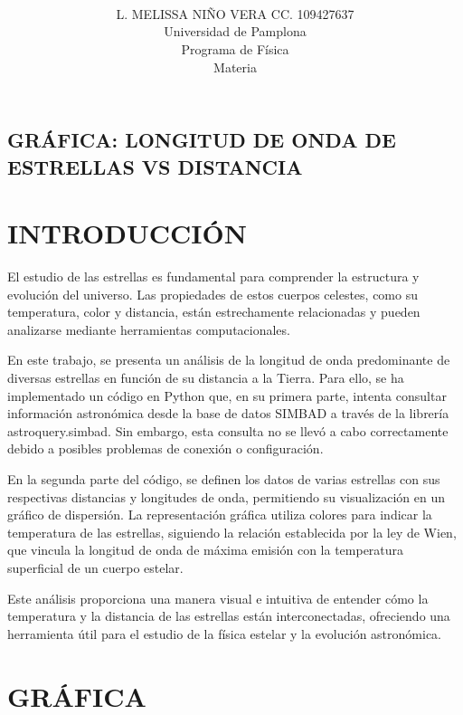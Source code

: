 \documentclass{article}
\title{ }
\author{\\ L. MELISSA NIÑO VERA   CC. 109427637 \\  Universidad de Pamplona \\ Programa de Física \\ Materia }
\begin{document}
\maketitle
\thispagestyle{fancy}

\begin{center}
    \section*{GRÁFICA: LONGITUD DE ONDA DE ESTRELLAS VS DISTANCIA}
\end{center}

\section{INTRODUCCIÓN}

El estudio de las estrellas es fundamental para comprender la estructura y evolución del universo. Las propiedades de estos cuerpos celestes, como su temperatura, color y distancia, están estrechamente relacionadas y pueden analizarse mediante herramientas computacionales.

En este trabajo, se presenta un análisis de la longitud de onda predominante de diversas estrellas en función de su distancia a la Tierra. Para ello, se ha implementado un código en Python que, en su primera parte, intenta consultar información astronómica desde la base de datos SIMBAD a través de la librería astroquery.simbad. Sin embargo, esta consulta no se llevó a cabo correctamente debido a posibles problemas de conexión o configuración.

En la segunda parte del código, se definen los datos de varias estrellas con sus respectivas distancias y longitudes de onda, permitiendo su visualización en un gráfico de dispersión. La representación gráfica utiliza colores para indicar la temperatura de las estrellas, siguiendo la relación establecida por la ley de Wien, que vincula la longitud de onda de máxima emisión con la temperatura superficial de un cuerpo estelar.

Este análisis proporciona una manera visual e intuitiva de entender cómo la temperatura y la distancia de las estrellas están interconectadas, ofreciendo una herramienta útil para el estudio de la física estelar y la evolución astronómica.

\section{GRÁFICA}
\end{document}
